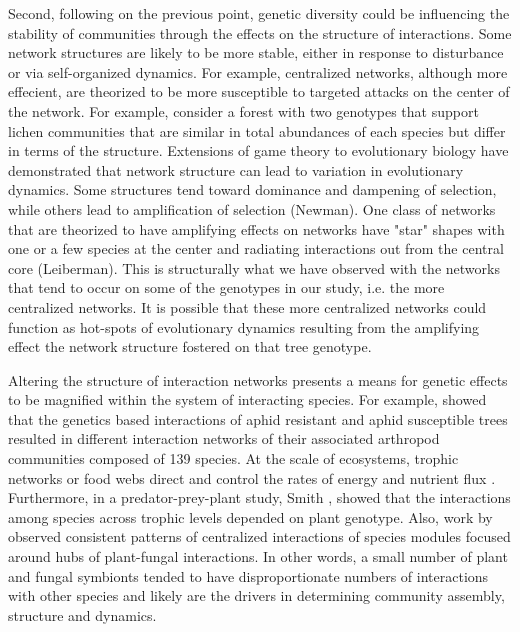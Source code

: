 \documentclass[11pt,twocolumn,twoside,lineno]{pnas-new}
\begin{document}
Second, following on the previous point, genetic diversity could be
influencing the stability of communities through the effects on the
structure of interactions. Some network structures are likely to be
more stable, either in response to disturbance or via self-organized
dynamics. For example, centralized networks, although more effecient,
are theorized to be more susceptible to targeted attacks on the center
of the network. For example, consider a forest with two genotypes that
support lichen communities that are similar in total abundances of
each species but differ in terms of the structure. Extensions of game
theory to evolutionary biology have demonstrated that network
structure can lead to variation in evolutionary dynamics. Some
structures tend toward dominance and dampening of selection, while
others lead to amplification of selection (Newman). One class of
networks that are theorized to have amplifying effects on networks
have "star" shapes with one or a few species at the center and
radiating interactions out from the central core (Leiberman). This is
structurally what we have observed with the networks that tend to
occur on some of the genotypes in our study, i.e. the more centralized
networks. It is possible that these more centralized networks could
function as hot-spots of evolutionary dynamics resulting from the
amplifying effect the network structure fostered on that tree
genotype.

Altering the structure of interaction networks presents a means for
genetic effects to be magnified within the system of interacting
species. For example, \citep{Keith2017} showed that the genetics based
interactions of aphid resistant and aphid susceptible trees resulted
in different interaction networks of their associated arthropod
communities composed of 139 species. At the scale of ecosystems,
trophic networks or food webs direct and control the rates of energy
and nutrient flux \cite{Borgatti2006}. Furthermore, in a
predator-prey-plant study, Smith \cite{Smith2011}, showed that the
interactions among species across trophic levels depended on plant
genotype. Also, work by \citep{Toju2017, Toju2016, Toju2014a} observed
consistent patterns of centralized interactions of species modules
focused around hubs of plant-fungal interactions. In other words, a
small number of plant and fungal symbionts tended to have
disproportionate numbers of interactions with other species and likely
are the drivers in determining community assembly, structure and
dynamics. 

\\
\end{document}
